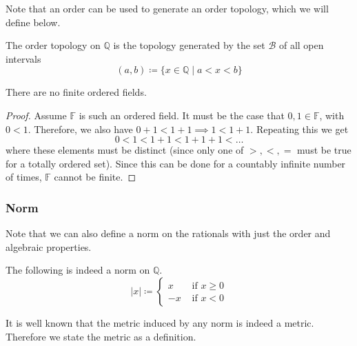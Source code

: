     Note that an order can be used to generate an order topology, which we will define below. 

    \begin{definition}
      The order topology on $\mathbb{Q}$ is the topology generated by the set $\mathscr{B}$ of all open intervals 
      \begin{equation}
        (a, b) \coloneqq \{ x \in \mathbb{Q} \mid a < x < b\}
      \end{equation}
    \end{definition}

    \begin{theorem}
      There are no finite ordered fields. 
    \end{theorem} 
    \begin{proof}
      Assume $\mathbb{F}$ is such an ordered field. It must be the case that $0, 1 \in \mathbb{F}$, with $0 < 1$. Therefore, we also have $0 + 1 < 1 + 1 \implies 1 < 1 + 1$. Repeating this we get 
      \begin{equation}
        0 < 1 < 1 + 1 < 1 + 1 + 1 < \ldots
      \end{equation}
      where these elements must be distinct (since only one of $>, <, =$ must be true for a totally ordered set). Since this can be done for a countably infinite number of times, $\mathbb{F}$ cannot be finite. 
    \end{proof}

  \subsubsection{Norm} 

    Note that we can also define a norm on the rationals with just the order and algebraic properties. 

    \begin{theorem} 
      The following is indeed a norm on $\mathbb{Q}$. 
      \begin{equation}
        |x| \coloneqq \begin{cases} x & \text{ if } x \geq 0 \\ -x & \text{ if } x < 0 \end{cases}
      \end{equation} 
    \end{theorem} 

    It is well known that the metric induced by any norm is indeed a metric. Therefore we state the metric as a definition. 

